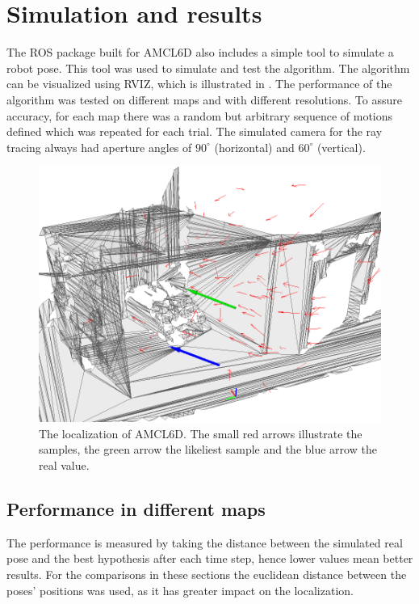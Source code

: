 \documentclass[Thesis.tex]{subfiles}
\begin{document}
\chapter{Simulation and results}

The \gls{ROS} package built for \gls{AMCL6D} also includes a simple tool to simulate a robot pose. This tool was used to simulate and test the algorithm. The algorithm can be visualized using RVIZ, which is illustrated in .
The performance of the algorithm was tested on different maps and with different resolutions. To assure accuracy, for each map there was a random but arbitrary sequence of motions defined which was repeated for each trial. The simulated camera for the ray tracing always had aperture angles of $90^\circ$ (horizontal) and $60^\circ$ (vertical).

\begin{figure}
\centering
\includegraphics[width=.8\columnwidth]{pics/amclaction}
\caption[AMCL6D localization]{The localization of AMCL6D. The small red arrows illustrate the samples, the green arrow the likeliest sample and the blue arrow the real value.}
\label{fig:amclaction}
\end{figure}

\section{Performance in different maps}
The performance is measured by taking the distance between the simulated real pose and the best hypothesis after each time step, hence lower values mean better results. For the comparisons in these sections the euclidean distance between the poses' positions was used, as it has greater impact on the localization.
\end{document}
